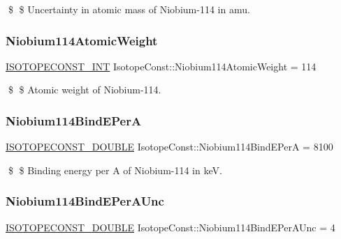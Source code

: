 \$ \$ Uncertainty in atomic mass of Niobium-\/114 in amu. \mbox{\label{group___isotope_const-_niobium-_nb114_gab41e9c6d51e7a85d23611cf8a7112083}} 
\subsubsection{\texorpdfstring{Niobium114\+Atomic\+Weight}{Niobium114AtomicWeight}}
{\footnotesize\ttfamily \mbox{\hyperlink{group___isotope_const-_macros_ga5f18360b3e99483a35c32d789e62621c}{I\+S\+O\+T\+O\+P\+E\+C\+O\+N\+S\+T\+\_\+\+I\+NT}} Isotope\+Const\+::\+Niobium114\+Atomic\+Weight = 114}

\$ \$ Atomic weight of Niobium-\/114. \mbox{\label{group___isotope_const-_niobium-_nb114_gae8b68b7cab9c725c44bfec3be9f28fb6}} 
\subsubsection{\texorpdfstring{Niobium114\+Bind\+E\+PerA}{Niobium114BindEPerA}}
{\footnotesize\ttfamily \mbox{\hyperlink{group___isotope_const-_macros_ga8f45a7272ce02c0b4c65c44636ed719a}{I\+S\+O\+T\+O\+P\+E\+C\+O\+N\+S\+T\+\_\+\+D\+O\+U\+B\+LE}} Isotope\+Const\+::\+Niobium114\+Bind\+E\+PerA = 8100}

\$ \$ Binding energy per A of Niobium-\/114 in keV. \mbox{\label{group___isotope_const-_niobium-_nb114_ga1131cc95f90eb2aea903a9a47fa5868a}} 
\subsubsection{\texorpdfstring{Niobium114\+Bind\+E\+Per\+A\+Unc}{Niobium114BindEPerAUnc}}
{\footnotesize\ttfamily \mbox{\hyperlink{group___isotope_const-_macros_ga8f45a7272ce02c0b4c65c44636ed719a}{I\+S\+O\+T\+O\+P\+E\+C\+O\+N\+S\+T\+\_\+\+D\+O\+U\+B\+LE}} Isotope\+Const\+::\+Niobium114\+Bind\+E\+Per\+A\+Unc = 4}

